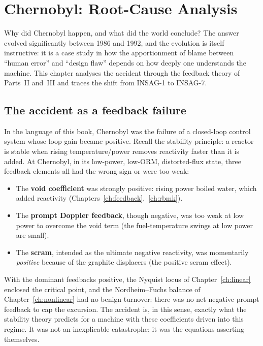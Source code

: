 \chapter{Chernobyl: Root-Cause Analysis}
\label{ch:analysis}

Why did Chernobyl happen, and what did the world conclude? The answer evolved
significantly between 1986 and 1992, and the evolution is itself instructive: it is
a case study in how the apportionment of blame between ``human error'' and
``design flaw'' depends on how deeply one understands the machine. This chapter
analyses the accident through the feedback theory of Parts~II and~III and traces
the shift from INSAG-1 to INSAG-7.

\section{The accident as a feedback failure}

In the language of this book, Chernobyl was the failure of a closed-loop control
system whose loop gain became positive. Recall the stability principle: a reactor
is stable when rising temperature/power removes reactivity faster than it is added.
At Chernobyl, in its low-power, low-ORM, distorted-flux state, three feedback
elements all had the wrong sign or were too weak:

\begin{itemize}[nosep]
\item The \textbf{void coefficient} was strongly positive: rising power boiled
water, which added reactivity (Chapters~\ref{ch:feedback},~\ref{ch:rbmk}).
\item The \textbf{prompt Doppler feedback}, though negative, was too weak at low
power to overcome the void term (the fuel-temperature swings at low power are
small).
\item The \textbf{scram}, intended as the ultimate negative reactivity, was
momentarily \emph{positive} because of the graphite displacers (the positive scram
effect).
\end{itemize}

With the dominant feedbacks positive, the Nyquist locus of Chapter~\ref{ch:linear}
enclosed the critical point, and the Nordheim--Fuchs balance of
Chapter~\ref{ch:nonlinear} had no benign turnover: there was no net negative
prompt feedback to cap the excursion. The accident is, in this sense, exactly what
the stability theory predicts for a machine with these coefficients driven into
this regime. It was not an inexplicable catastrophe; it was the equations
asserting themselves.

